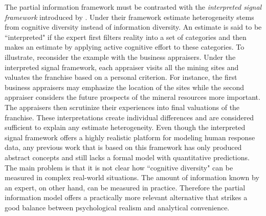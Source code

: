 \documentclass[11pt,twoside]{article}
\theoremstyle{definition}
\theoremstyle{definition}
\begin{document}
The partial information framework must be contrasted with the \textit{interpreted signal framework} introduced by  \cite{hong2009interpreted}. Under their framework estimate heterogeneity stems from cognitive diversity instead of information diversity. An estimate is said to be ``interpreted" if the expert
first filters reality into a set of categories and then makes an
estimate by applying active cognitive effort to these categories. To illustrate, reconsider the example with the business appraisers. Under the interpreted signal framework, each appraiser visits all the mining sites and valuates the franchise based on a personal criterion. For instance, the first business appraisers may emphasize the location of the sites while the second appraiser considers the future prospects of the mineral resources more important. The appraisers then scrutinize their experiences into final valuations of the franchise. 
%
These interpretations create individual differences and are considered sufficient to explain any estimate heterogeneity. Even though the interpreted signal framework offers a highly realistic platform for modeling human response data, any previous work that is based on this framework has only produced abstract concepts and still lacks a formal model with quantitative predictions. The main problem is that it is not clear how ``cognitive diversity" can be measured in complex real-world situations. The amount of information known by an expert, on other hand, can be measured in practice. Therefore the partial information model offers a practically more relevant alternative that strikes a good balance between psychological realism and analytical convenience. 



\end{document}
